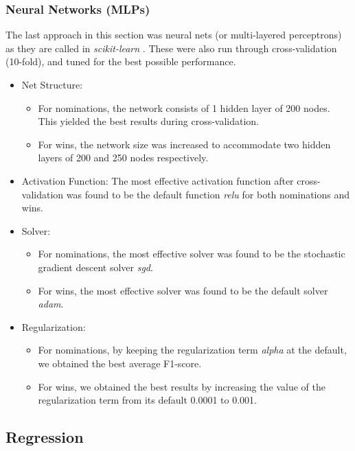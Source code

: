 \documentclass[journal,transmag]{IEEEtran}
\begin{document}
			\subsubsection{Neural Networks (MLPs)}
			The last approach in this section was neural nets \cite{anns} (or multi-layered perceptrons) as they are called in \emph{scikit-learn} \cite{skl-anns}. These were also run through cross-validation (10-fold), and tuned for the best possible performance.
			\begin{itemize}
				\item Net Structure:
				\begin{itemize}
					\item For nominations, the network consists of 1 hidden layer of 200 nodes. This yielded the best results during cross-validation.
					\item For wins, the network size was increased to accommodate two hidden layers of 200 and 250 nodes respectively.
				\end{itemize}
				\item Activation Function:
					\newline
					The most effective activation function after cross-validation was found to be the default function \emph{relu} for both nominations and wins.
				\item Solver:
					\begin{itemize}
						\item For nominations, the most effective solver was found to be the stochastic gradient descent solver \emph{sgd}.
						\item For wins, the most effective solver was found to be the default solver \emph{adam}.
					\end{itemize}
				\item Regularization:
					\begin{itemize}
						\item For nominations, by keeping the regularization term \emph{alpha} at the default, we obtained the best average F1-score.
						\item For wins, we obtained the best results by increasing the value of the regularization term from its default 0.0001 to 0.001.
					\end{itemize}
			\end{itemize}
			
		\subsection{Regression}
			
\end{document}
